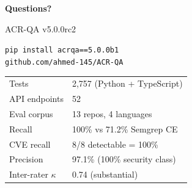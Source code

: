 \documentclass[aspectratio=169,12pt]{beamer}
\begin{document}
\begin{frame}[standout]
  \begin{center}
    {\Huge \textbf{Questions?}}

    \vspace{12pt}
    {\large ACR-QA v5.0.0rc2}

    \vspace{8pt}
    \small
    \texttt{pip install acrqa==5.0.0b1}\\
    \texttt{github.com/ahmed-145/ACR-QA}

    \vspace{12pt}
    \begin{tabular}{ll}
      Tests          & 2,757 (Python + TypeScript) \\
      API endpoints  & 52 \\
      Eval corpus    & 13 repos, 4 languages \\
      Recall         & 100\% vs 71.2\% Semgrep CE \\
      CVE recall     & 8/8 detectable = 100\% \\
      Precision      & 97.1\% (100\% security class) \\
      Inter-rater $\kappa$ & 0.74 (substantial) \\
    \end{tabular}
  \end{center}
\end{frame}
\end{document}
